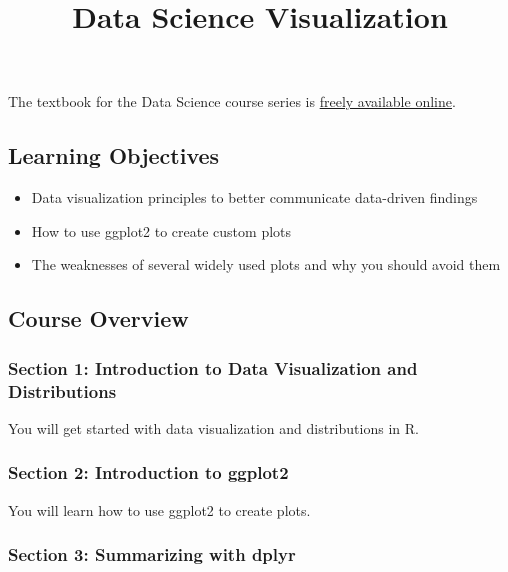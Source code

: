 \documentclass[
]{article}
\title{Data Science Visualization}
\author{}
\date{\vspace{-2.5em}}
\providecommand{\tightlist}{%
  \setlength{\itemsep}{0pt}\setlength{\parskip}{0pt}}
\begin{document}
\maketitle

The textbook for the Data Science course series is
\href{https://rafalab.github.io/dsbook/}{freely available online}.

\hypertarget{learning-objectives}{%
\subsection{Learning Objectives}\label{learning-objectives}}

\begin{itemize}
\tightlist
\item
  Data visualization principles to better communicate data-driven
  findings
\item
  How to use ggplot2 to create custom plots
\item
  The weaknesses of several widely used plots and why you should avoid
  them
\end{itemize}

\hypertarget{course-overview}{%
\subsection{Course Overview}\label{course-overview}}

\hypertarget{section-1-introduction-to-data-visualization-and-distributions}{%
\subsubsection{Section 1: Introduction to Data Visualization and
Distributions}\label{section-1-introduction-to-data-visualization-and-distributions}}

You will get started with data visualization and distributions in R.

\hypertarget{section-2-introduction-to-ggplot2}{%
\subsubsection{Section 2: Introduction to
ggplot2}\label{section-2-introduction-to-ggplot2}}

You will learn how to use ggplot2 to create plots.

\hypertarget{section-3-summarizing-with-dplyr}{%
\subsubsection{Section 3: Summarizing with
dplyr}\label{section-3-summarizing-with-dplyr}}
\end{document}
